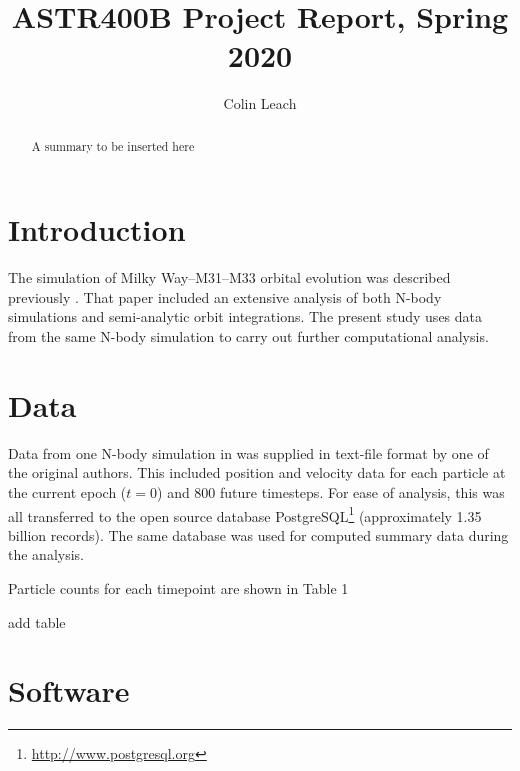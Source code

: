 \documentclass{aastex63}
\newcommand{\todo}{\color{red}{TODO}\color{black}\hspace{2mm}}
\begin{document}
	
\title{ASTR400B Project Report, Spring 2020}

\author[0000-0003-3608-1546]{Colin Leach}

\begin{abstract}
	
A summary to be inserted here

\end{abstract}

\section{Introduction}

The simulation of Milky Way--M31--M33 orbital evolution was described previously \citep{marel_m31_2012}. That paper included an extensive analysis of both N-body simulations and semi-analytic orbit integrations. The present study uses data from the same N-body simulation to carry out further computational analysis.

\section{Data}

Data from one N-body simulation in \citep{marel_m31_2012} was supplied in text-file format by one of the original authors. This included position and velocity data for each particle at the current epoch ($t=0$) and 800 future timesteps. For ease of analysis, this was all transferred to the open source database PostgreSQL\footnote{\url{http://www.postgresql.org}} (approximately 1.35 billion records). The same database was used for computed summary data during the analysis.

Particle counts for each timepoint are shown in Table 1

\todo add table

\section{Software}



\citep{toomre_galactic_1972}


{}

\end{document}
